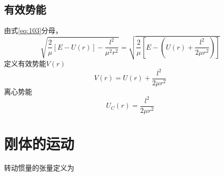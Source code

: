 \documentclass{article}
\begin{document}
\subsection{有效势能}

由式\ref{eq:103}分母，
\begin{equation}
  \label{eq:118}
    \sqrt{\dfrac{2}{\mu} \left[ E - U(r) \right] - \dfrac{l^{2}}{\mu^{2} r^{2}} } = \sqrt{\dfrac{2}{\mu} \left[ E - \left( U(r)  + \dfrac{l^{2}}{2 \mu r^{2}} \right) \right]}
\end{equation}
定义有效势能$V(r)$
\begin{equation}
  \label{eq:119}
  V(r) = U(r)  + \dfrac{l^{2}}{2 \mu r^{2}}
\end{equation}
离心势能
\begin{equation}
  \label{eq:120}
  U_{C}(r) = \dfrac{l^{2}}{2 \mu r^{2}}
\end{equation}

\section{刚体的运动}

转动惯量的张量定义为
\end{document}
